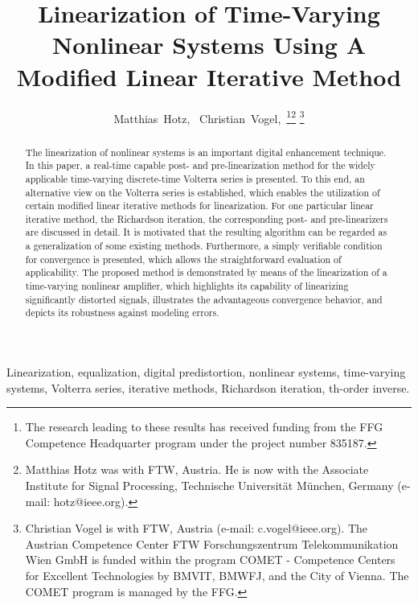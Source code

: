 \documentclass[10pt,twocolumn,twoside]{IEEEtran}
\begin{document}
\title{Linearization of Time-Varying Nonlinear Systems Using A Modified Linear Iterative Method}

\author{Matthias~Hotz,~
        Christian~Vogel,~\thanks{The research leading to these results has received funding from the FFG
Competence Headquarter program under the project number 835187.}\thanks{Matthias Hotz was with FTW, Austria. He is now with the Associate Institute for
Signal Processing, Technische Universit{\"a}t M{\"u}nchen, Germany (e-mail: hotz@ieee.org).}
\thanks{Christian Vogel is with FTW, Austria (e-mail: c.vogel@ieee.org).
The Austrian Competence Center FTW Forschungszentrum Telekommunikation Wien GmbH
is funded within the program COMET - Competence Centers for Excellent Technologies
by BMVIT, BMWFJ, and the City of Vienna. The COMET program is managed by the FFG.}}

\maketitle


\begin{abstract}
The linearization of nonlinear systems is an important digital
enhancement technique. In this paper, a real-time capable post- and pre-linearization
method for the widely applicable time-varying discrete-time Volterra
series is presented. To this end, an alternative view on the Volterra
series is established, which enables the utilization of certain modified
linear iterative methods for linearization. For one particular linear
iterative method, the Richardson iteration, the corresponding post- and pre-linearizers are discussed
in detail. It is motivated that the resulting algorithm can be regarded
as a generalization of some existing methods. Furthermore, a simply verifiable
condition for convergence is presented, which allows the straightforward
evaluation of applicability. The proposed method is demonstrated by means
of the linearization of a time-varying nonlinear amplifier, which highlights
its capability of linearizing significantly distorted signals, illustrates the
advantageous convergence behavior, and depicts its robustness against modeling errors.
\end{abstract}

\begin{IEEEkeywords}
Linearization, equalization, digital predistortion, nonlinear systems, time-varying systems,
Volterra series, iterative methods, Richardson iteration, th-order inverse. \end{IEEEkeywords}
\end{document}
